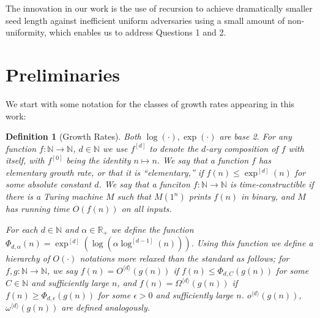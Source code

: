 \documentclass[11pt]{article}
\newtheorem{definition}{Definition}
\newcommand{\od}[1]{O^{\langle #1 \rangle}}
\newcommand{\lilod}[1]{o^{\langle #1 \rangle}}
\newcommand{\omd}[1]{\Omega^{\langle #1 \rangle}}
\newcommand{\semi}[2]{\Phi_{#1,#2}}
\begin{document}
The innovation in our work is the use of recursion to achieve dramatically smaller seed length against inefficient uniform adversaries using a small amount of non-uniformity, which enables us to address Questions 1 and 2.


\section{Preliminaries}
We start with some notation for the classes of growth rates appearing in this work:


\begin{definition}[Growth Rates]
Both $\log(\cdot), \exp(\cdot)$ are base 2. For any function $f: \mathbb{N} \to \mathbb{N}$, $d \in \mathbb{N}$ we use $f^{[d]}$ to denote the $d$-ary composition of $f$ with itself, with $f^{[0]}$ being the identity $n \mapsto n$. We say that a function $f$ has elementary growth rate, or that it is ``elementary,'' if $f(n) \leq \exp^{[d]}(n)$ for some absolute constant $d$. We say that a funciton $f: \mathbb{N} \to \mathbb{N}$ is time-constructible if there is a Turing machine $M$ such that $M(1^n)$ prints $f(n)$ in binary, and $M$ has running time $O(f(n))$ on all inputs.

For each $d \in \mathbb{N}$ and $\alpha \in \mathbb{R}_{+}$ we define the function $\semi{d}{\alpha}(n) = \exp^{[d]}(\log(\alpha \log^{[d-1]}(n)))$.
Using this function we define a hierarchy of $O(\cdot)$ notations more relaxed than the standard as follows; for $f,g:\mathbb{N} \to \mathbb{N}$, we say $f(n) = \od{d}(g(n))$ if $f(n) \leq \semi{d}{C}(g(n))$ for some $C \in \mathbb{N}$ and sufficiently large $n$, and $f(n) = \omd{d}(g(n))$ if $f(n) \geq \semi{d}{\epsilon}(g(n))$ for some $\epsilon > 0$ and sufficiently large $n$. $\lilod{d}(g(n))$, $\omega^{\langle d \rangle}(g(n))$ are defined analogously. 
\end{definition}
\end{document}
